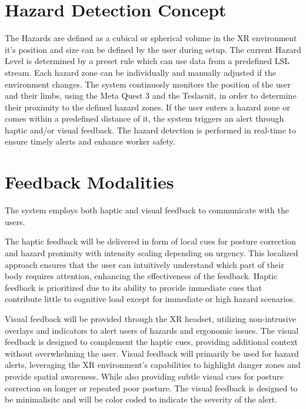 \section{Hazard Detection Concept}
The Hazards are defined as a cubical or spherical volume in the XR environment it's position and size can be defined by the user during setup. The current Hazard Level is determined by a preset rule which can use data from a predefined LSL stream.
Each hazard zone can be individually and manually adjusted if the environment changes.
The system continuosly monitors the position of the user and their limbs, using the Meta Quest 3 and the Teslasuit, in order to determine their proximity to the defined hazard zones. If the user enters a hazard zone or comes within a predefined distance of it, the system triggers an alert through haptic and/or visual feedback. The hazard detection is performed in real-time to ensure timely alerts and enhance worker safety. 

\section{Feedback Modalities}
The system employs both haptic and visual feedback to communicate with the users. 

The haptic feedback will be delivered in form of local cues for posture correction and hazard proximity with intensity scaling depending on urgency. This localized approach ensures that the user can intuitively understand which part of their body requires attention, enhancing the effectiveness of the feedback. Haptic feedback is prioritized due to its ability to provide immediate cues that contribute little to cognitive load except for immediate or high hazard scenarios. 

Visual feedback will be provided through the XR headset, utilizing non-intrusive overlays and indicators to alert users of hazards and ergonomic issues. The visual feedback is designed to complement the haptic cues, providing additional context without overwhelming the user. Visual feedback will primarily be used for hazard alerts, leveraging the XR environment's capabilities to highlight danger zones and provide spatial awareness. While also providing subtle visual cues for posture correction on longer or repeated poor posture. The visual feedback is designed to be minimalisitc and will be color coded to indicate the severity of the alert.

